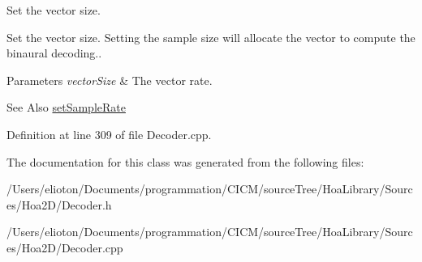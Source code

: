 Set the vector size. 

Set the vector size. Setting the sample size will allocate the vector to compute the binaural decoding..


\begin{DoxyParams}{Parameters}
{\em vector\-Size} & The vector rate.\\
\hline
\end{DoxyParams}
\begin{DoxySeeAlso}{See Also}
\hyperlink{class_hoa2_d_1_1_decoder_binaural_a6a96a705952a4165dd916c74b64b60e4}{set\-Sample\-Rate} 
\end{DoxySeeAlso}


Definition at line 309 of file Decoder.\-cpp.



The documentation for this class was generated from the following files\-:\begin{DoxyCompactItemize}
\item 
/\-Users/elioton/\-Documents/programmation/\-C\-I\-C\-M/source\-Tree/\-Hoa\-Library/\-Sources/\-Hoa2\-D/Decoder.\-h\item 
/\-Users/elioton/\-Documents/programmation/\-C\-I\-C\-M/source\-Tree/\-Hoa\-Library/\-Sources/\-Hoa2\-D/Decoder.\-cpp\end{DoxyCompactItemize}
